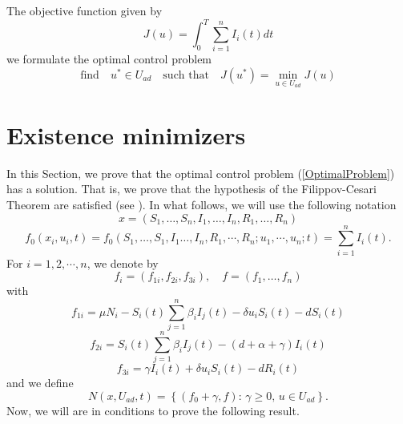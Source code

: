 \documentclass[a4paper,10pt]{article}
\theoremstyle{remark}
\begin{document}
The objective function given by
\[ J( u)=\int_{0}^{T} \sum_{i=1}^{n} I_{i}(t) d t\]
we formulate the optimal control problem 
\begin{equation}\label{OptimalProblem}
\text{find}\quad  u^{*} \in U_{a d} \quad \text{such that}\quad 
          J\left( u^{*}\right)=\min _{ u\in  U_{a d}} J( u)
\end{equation}



\section{Existence minimizers}

In this Section, we prove that the optimal control problem (\ref{OptimalProblem}) has a solution. That is, we prove that the hypothesis of the Filippov-Cesari Theorem are satisfied (see \cite{A.Seierstad499}). In what follows, we will use the following notation
$$
x=\left(S_{1}, \ldots, S_{n}, I_{1}, \ldots, I_{n}, R_{1},\ldots, R_{n}\right)
$$
\[f_{0}\left(x_{i},  u_{i}, t\right)=f_{0}\left(S_{1}, \ldots, S_{1}, I_{1}\ldots, I_n, R_{1}, \cdots, R_{n} ;  u_{1}, \cdots,  u_{n} ; t\right)=\sum_{i=1}^{n} I_{i}(t).\]
For $i=1,2,\cdots, n$, we denote by
$$
f_{i}=\left(f_{1 i}, f_{2 i}, f_{3 i}\right), \quad  f=\left(f_{1}, \ldots, f_{n}\right) 
$$
with
\[f_{1 i}=\mu N_{i}-S_{i}(t) \sum_{j=1}^{n} \beta_{i} I_{j}(t)-\delta  u_{i} S_{i}(t)-d S_{i}(t)\]
\[f_{2i}=S_{i}(t) \sum_{j=1}^{n} \beta_{i} I_{j}(t)-(d+\alpha+\gamma) I_{i}(t)\]
\[f_{3 i}=\gamma I_{i}(t)+\delta  u_{i} S_{i}(t)-d R_{i}(t)\]
and we define
$$N\left(x, U_{a d}, t\right)=\left\{\left(f_{0}+\gamma, f\right):\, \gamma \geq 0,\,  u \in U_{a d}\right\}.$$
Now, we will are in conditions to prove the following result.
\end{document}
